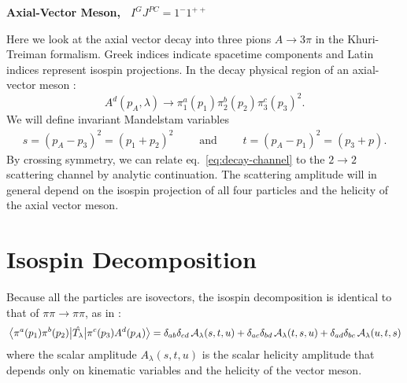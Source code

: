 \documentclass[10pt, aps,prd,amsmath,amssymb,superscriptaddress,onecolumn,
nofootinbib,showpacs,preprintnumbers]{revtex4-1}
\begin{document}
\begin{center}
\large \textbf{Axial-Vector Meson, \, \(I^G J^{PC} = 1^-1^{++}\)}
\end{center}

Here we look at the axial vector decay into three pions \(A \to 3\pi\) in the Khuri-Treiman formalism. Greek indices indicate spacetime components and Latin indices represent isospin projections.
In the decay physical region of an axial-vector meson :
  \begin{equation}
    \label{eq:decay-channel}
    A^d(p_A, \lambda) \rightarrow \pi_1^a(p_1) \pi_2^b(p_2) \pi^c_3(p_3)^2.
  \end{equation}
We will define invariant Mandelstam variables
  \begin{align}
    s = (p_A - p_3)^2 = (p_1 + p_2)^2 \qquad \text{ and } \qquad t = (p_A - p_1)^2 = (p_3 + p).
  \end{align}
By crossing symmetry, we can relate eq.~\ref{eq:decay-channel} to the \(2\to2\) scattering channel by analytic continuation. The scattering amplitude will in general depend on the isospin projection of all four particles and the helicity of the axial vector meson.
\section{Isospin Decomposition}
Because all the particles are isovectors, the isospin decomposition is identical to that of \(\pi\pi\to\pi\pi\), as in \cite{Albaladejo2018}:
  \begin{equation}
    \label{eq:scalar-decomp}
    \mel{\pi^a(p_1)\pi^b(p_2)}{\hat{T_\lambda}}{\pi^c(p_3)A^d(p_A)} = \delta_{ab}\delta_{cd} \, \mathcal{A}_\lambda(s,t,u) + \delta_{ac}\delta_{bd} \, \mathcal{A}_\lambda(t,s,u) + \delta_{ad}\delta_{bc} \, \mathcal{A}_\lambda(u,t,s)
  \end{equation}
where the scalar amplitude \(A_\lambda(s,t,u)\) is the scalar helicity amplitude that depends only on kinematic variables and the helicity of the vector meson.
\end{document}
